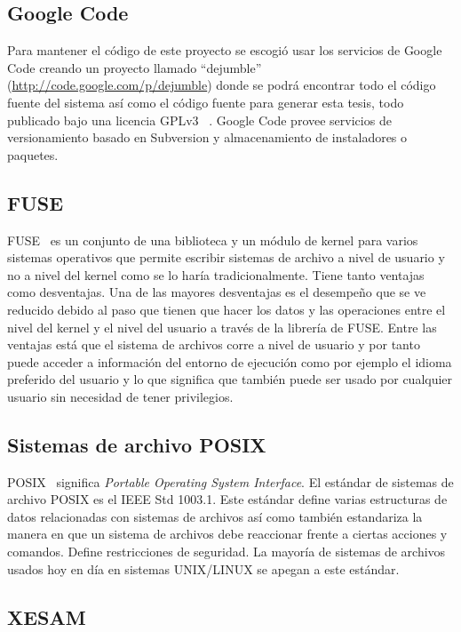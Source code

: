 \subsection{Google Code}

Para mantener el código de este proyecto se escogió usar los servicios de Google Code creando un proyecto llamado ``dejumble'' (\url{http://code.google.com/p/dejumble}) donde se podrá encontrar todo el código fuente del sistema así como el código fuente para generar esta tesis, todo publicado bajo una licencia GPLv3 ~\cite{gpl:website}. Google Code provee servicios de versionamiento basado en Subversion y almacenamiento de instaladores o paquetes. 


\subsection{FUSE}

FUSE~\cite{fuse:website} es un conjunto de una biblioteca y un módulo de kernel para varios sistemas operativos que permite escribir sistemas de archivo a nivel de usuario y no a nivel del kernel como se lo haría tradicionalmente. Tiene tanto ventajas como desventajas. Una de las mayores desventajas es el desempeño que se ve reducido debido al paso que tienen que hacer los datos y las operaciones entre el nivel del kernel y el nivel del usuario a través de la librería de FUSE. Entre las ventajas está que el sistema de archivos corre a nivel de usuario y por tanto puede acceder a información del entorno de ejecución como por ejemplo el idioma preferido del usuario y lo que significa que también puede ser usado por cualquier usuario sin necesidad de tener privilegios.

\subsection{Sistemas de archivo POSIX}

POSIX~\cite{posix:website} significa \textit{Portable Operating System Interface}. El estándar de sistemas de archivo POSIX es el IEEE Std 1003.1. Este estándar define varias estructuras de datos relacionadas con sistemas de archivos así como también estandariza la manera en que un sistema de archivos debe reaccionar frente a ciertas acciones y comandos. Define restricciones de seguridad. La mayoría de sistemas de archivos usados hoy en día en sistemas UNIX/LINUX se apegan a este estándar.

\subsection{XESAM}

